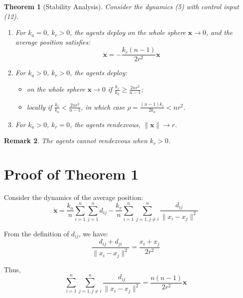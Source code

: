 \documentclass{article}
\newtheorem{theorem}{Theorem}[section]
\newtheorem{remark}[theorem]{Remark}
\begin{document}
\begin{theorem}[Stability Analysis]
Consider the dynamics (5) with control input (12).

\begin{enumerate}
\item For $k_a = 0$, $k_r > 0$, the agents deploy on the whole sphere $\boldsymbol{x} \to 0$, and the average position satisfies:
\begin{equation}
\dot{\boldsymbol{x}} = -\frac{k_r(n-1)}{2r^2} \boldsymbol{x}
\end{equation}

\item For $k_a > 0$, $k_r > 0$, the agents deploy:
\begin{itemize}
\item on the whole sphere $\boldsymbol{x} \to 0$ if $\frac{k_r}{k_a} \geq \frac{2nr^2}{n-1}$;
\item locally if $\frac{k_r}{k_a} < \frac{2nr^2}{n-1}$, in which case $\rho = \frac{(n-1)k_r}{2k_a} < nr^2$.
\end{itemize}

\item For $k_a > 0$, $k_r = 0$, the agents rendezvous, $\|\boldsymbol{x}\| \to r$.
\end{enumerate}
\end{theorem}

\begin{remark}
The agents cannot rendezvous when $k_r > 0$.
\end{remark}

\section{Proof of Theorem 1}

Consider the dynamics of the average position:
\begin{equation}
\dot{\boldsymbol{x}} = \frac{k_a}{n} \sum_{i=1}^n \sum_{j=1}^n d_{ij} - \frac{k_r}{n} \sum_{i=1}^n \sum_{j=1, j \neq i}^n \frac{d_{ij}}{\|x_i - x_j\|^2}
\end{equation}

From the definition of $d_{ij}$, we have:
\begin{equation}
\frac{d_{ij} + d_{ji}}{\|x_i - x_j\|^2} = \frac{x_i + x_j}{2r^2}
\end{equation}

Thus,
\begin{equation}
\sum_{i=1}^n \sum_{j=1, j \neq i}^n \frac{d_{ij}}{\|x_i - x_j\|^2} = \frac{n(n-1)}{2r^2} \boldsymbol{x}
\end{equation}
\end{document}
